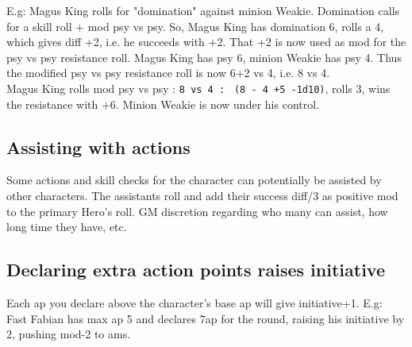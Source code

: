 E.g: Magus King rolls for "domination" against minion Weakie. Domination calls for a skill roll + mod psy vs psy. So, Magus King has domination 6, rolls a 4, which gives diff +2, i.e. he succeeds with +2. That +2 is now used as mod for the psy vs psy resistance roll. Magus King has psy 6, minion Weakie has psy 4. Thus the modified psy vs psy resistance roll is now 6+2 vs 4, i.e. 8 vs 4.\\
Magus King rolls mod psy vs psy : \verb|8 vs 4 : | \verb|(8 - 4 +5 -1d10)|, rolls 3, wins the resistance with +6. Minion Weakie is now under his control.



\subsection*{Assisting with actions}
Some actions and skill checks for the character can potentially be assisted by other characters. The assistants roll and add their success diff/3 as positive mod to the primary Hero's roll. GM discretion regarding who many can assist, how long time they have, etc.


















\subsection*{Declaring extra action points raises initiative}
Each ap you declare above the character's base ap will give initiative+1.
E.g: Fast Fabian has max ap 5 and declares 7ap for the round, raising his initiative by 2, pushing mod-2 to ams.


